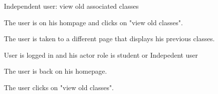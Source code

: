
\begin{uc}{Independent user: view old associated classes}

    \begin{uc-mss}
    \item The user is on his hompage and clicks on "view old classes".
    \item The user is taken to a different page that displays his previous classes.
    \end{uc-mss}

    \begin{uc-pre}
    \item User is logged in and his actor role is student or Indepedent user
    \end{uc-pre}

    \begin{uc-post}
    \item The user is back on his homepage.
    \end{uc-post}

    \begin{uc-trig}
        The user clicks on "view old classes".
    \end{uc-trig}

\end{uc}

